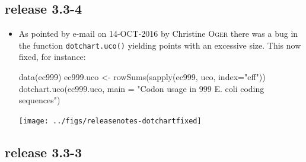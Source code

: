 \documentclass{article}
\begin{document}
\subsection*{release 3.3-4}

\begin{itemize}

\item As pointed by e-mail on 14-OCT-2016 by Christine \textsc{Oger} there was a bug in the function \texttt{dotchart.uco()} yielding points with an excessive size. This now fixed, for instance:

\begin{Schunk}
\begin{Sinput}
 data(ec999)
 ec999.uco <- rowSums(sapply(ec999, uco, index="eff"))
 dotchart.uco(ec999.uco, main = "Codon usage in 999 E. coli coding sequences") 
\end{Sinput}
\end{Schunk}
\texttt{[image: ../figs/releasenotes-dotchartfixed]}

\end{itemize}

\subsection*{release 3.3-3}
\end{document}
